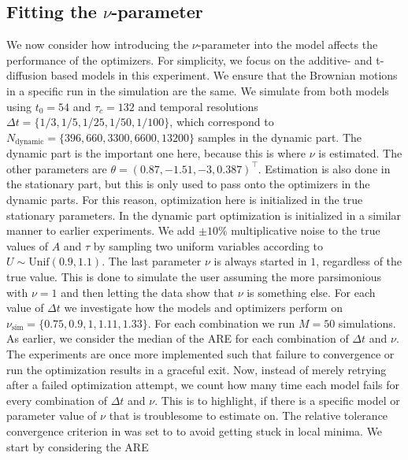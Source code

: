 \subsection{Fitting the $\nu$-parameter}
We now consider how introducing the $\nu$-parameter into the model affects the performance of the optimizers. For simplicity, we focus on the additive- and t-diffusion based models in this experiment. We ensure that the Brownian motions in a specific run in the simulation are the same. We simulate from both models using $t_0 = 54$ and $\tau_c = 132$ and temporal resolutions $\Delta t = \{1/3, 1/5, 1/25, 1/50, 1/100\}$, which correspond to $N_\mathrm{dynamic} = \{396, 660, 3300, 6600, 13200\}$ samples in the dynamic part. The dynamic part is the important one here, because this is where $\nu$ is estimated. The other parameters are $\theta = (0.87, -1.51, -3,  0.387)^\top$. Estimation is also done in the stationary part, but this is only used to pass onto the optimizers in the dynamic parts. For this reason, optimization here is initialized in the true stationary parameters. In the dynamic part optimization is initialized in a similar manner to earlier experiments. We add $\pm 10\%$ multiplicative noise to the true values of $A$ and $\tau$ by sampling two uniform variables according to $U\sim \mathrm{Unif}(0.9,1.1)$. The last parameter $\nu$ is always started in $1$, regardless of the true value. This is done to simulate the user assuming the more parsimonious with $\nu = 1$ and then letting the data show that $\nu$ is something else. For each value of $\Delta t$ we investigate how the models and optimizers perform on $\nu_{\mathrm{sim}} = \{0.75, 0.9, 1, 1.11, 1.33\}$. For each combination we run $M = 50$ simulations. As earlier, we consider the median of the ARE for each combination of $\Delta t$ and $\nu$. The experiments are once more implemented such that failure to convergence or run the optimization results in a graceful exit. Now, instead of merely retrying after a failed optimization attempt, we count how many time each model fails for every combination of $\Delta t$ and $\nu$. This is to highlight, if there is a specific model or parameter value of $\nu$ that is troublesome to estimate on. The relative tolerance convergence criterion in  was set to  to avoid getting stuck in local minima. 
We start by considering the ARE 
